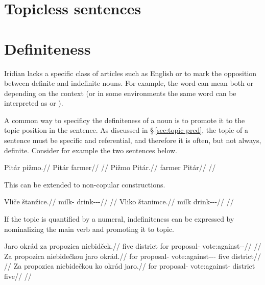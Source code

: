 \section{Topicless sentences}\label{sec:topicless}

\section{Definiteness}\label{sec:definiteness}

Iridian lacks a specific class of articles such as English
 or  to mark the opposition between definite and indefinite
nouns. For example, the word  can mean both  or  depending on the context (or in some environments the same word can be
interpreted as   or ).

A common way to specificy the definiteness of a noun is to promote it to the
topic position in the sentence. As discussed in \S\,\ref{sec:topic-pred}, the
topic of a sentence must be specific and referential, and therefore it is often,
but not always, definite. Consider for example the two sentences below.

\begin{multicols}{2}
  \pex
  \a
  \begingl
  \gla Pitár pižmo.//
  \glb Pitár farmer//
  \glft {}//
  \endgl
  \a
  \begingl
  \gla Pižmo Pitár.//
  \glb farmer Pitár//
  \glft {}//
  \endgl
  \xe
\end{multicols}

This can be extended to non-copular constructions.

\begin{multicols}{2}
  \pex
  \a
  \begingl
  \gla Vliče štanžice.//
  \glb milk-\Gen{} drink-\Av{}-\Pf{}-\Quot{}//
  \glft {}//
  \endgl
  \a
  \begingl
  \gla Vliko štanimce.//
  \glb milk drink-\Pv{}-\Pf{}-\Quot{}//
  \glft {}//
  \endgl
  \xe
\end{multicols}

If the topic is quantified by a numeral, indefiniteness can be expressed by nominalizing the main verb and promoting it to topic.

\pex
\a
\begingl
\gla Jaro okrád za propozica niebidček.//
\glb five district for proposal-\Acc{} vote:against-\Av{}-\Pf{}//
\glft {}//
\endgl
\a
\begingl
\gla Za propozica niebidečkou jaro okrád.//
\glb for proposal-\Acc{} vote:against-\Av{}-\Pf{}-\Nz{} five district//
\glft {}//
\endgl
\a
\begingl
\gla Za propozica niebidečkou ko okrád jaro.//
\glb for proposal-\Acc{} vote:against-  district five//
\glft {}//
\endgl
\xe

